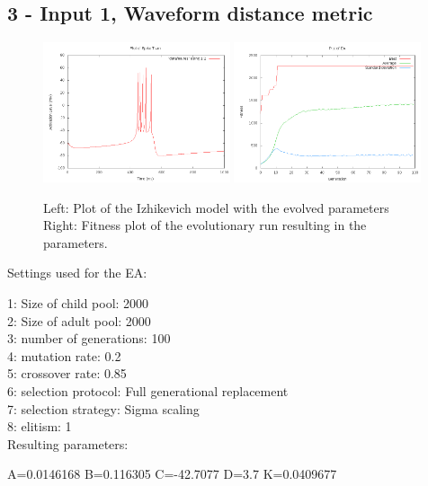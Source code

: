 \documentclass[11pt]{article}
\begin{document}
\subsection*{3 - Input 1, Waveform distance metric}

\begin{figure}
\begin{center}
\mbox{\includegraphics[width=0.49\textwidth]{images/3-res.png}}
\mbox{\includegraphics[width=0.49\textwidth]{images/3-fit.png}}
\end{center}
\caption{Left: Plot of the Izhikevich model with the evolved parameters\\
Right: Fitness plot of the evolutionary run resulting in the parameters.}
\label{fig:3}
\end{figure}

Settings used for the EA:

1: Size of child pool: 2000\\
2: Size of adult pool: 2000\\
3: number of generations: 100\\
4: mutation rate: 0.2\\
5: crossover rate: 0.85\\
6: selection protocol: Full generational replacement\\
7: selection strategy: Sigma scaling\\
8: elitism: 1\\

Resulting parameters:

A=0.0146168 B=0.116305 C=-42.7077 D=3.7 K=0.0409677
\end{document}
